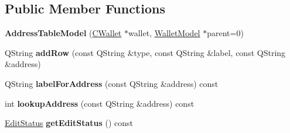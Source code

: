 \subsection*{Public Member Functions}
\begin{DoxyCompactItemize}
\item 
\mbox{\label{class_address_table_model_a273787011f7e387cc68b8282539fb9ef}} 
{\bfseries Address\+Table\+Model} (\mbox{\hyperlink{class_c_wallet}{C\+Wallet}} $\ast$wallet, \mbox{\hyperlink{class_wallet_model}{Wallet\+Model}} $\ast$parent=0)
\item 
\mbox{\label{class_address_table_model_aa72edd2a093a6e9318639d69d3a23488}} 
Q\+String {\bfseries add\+Row} (const Q\+String \&type, const Q\+String \&label, const Q\+String \&address)
\item 
\mbox{\label{class_address_table_model_afcdbfc17ac480f5a57382cbcf096ccb3}} 
Q\+String {\bfseries label\+For\+Address} (const Q\+String \&address) const
\item 
\mbox{\label{class_address_table_model_a0beb94d838781d9055e393b37bf68f83}} 
int {\bfseries lookup\+Address} (const Q\+String \&address) const
\item 
\mbox{\label{class_address_table_model_a360a3dcd3381dab1d81f5124755e927a}} 
\mbox{\hyperlink{class_address_table_model_a3d502b85fc09461e779dae4589c29956}{Edit\+Status}} {\bfseries get\+Edit\+Status} () const
\end{DoxyCompactItemize}
